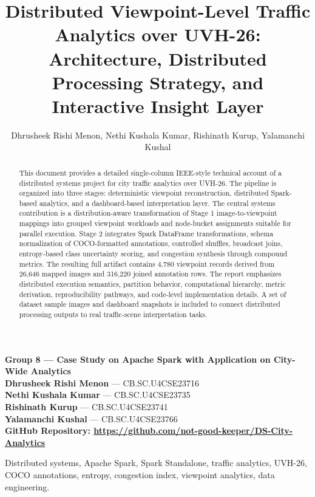 \documentclass[journal,onecolumn]{IEEEtran}
\title{Distributed Viewpoint-Level Traffic Analytics over UVH-26: \\
Architecture, Distributed Processing Strategy, and Interactive Insight Layer}
\author{Dhrusheek Rishi Menon, Nethi Kushala Kumar, Rishinath Kurup, Yalamanchi Kushal}
\begin{document}
\maketitle

\begin{center}
\textbf{Group 8 --- Case Study on Apache Spark with Application on City-Wide Analytics}\\[4pt]
\textbf{Dhrusheek Rishi Menon} --- CB.SC.U4CSE23716\\[2pt]
\textbf{Nethi Kushala Kumar} --- CB.SC.U4CSE23735\\[2pt]
\textbf{Rishinath Kurup} --- CB.SC.U4CSE23741\\[2pt]
\textbf{Yalamanchi Kushal} --- CB.SC.U4CSE23766\\[6pt]
\textbf{GitHub Repository: \url{https://github.com/not-good-keeper/DS-City-Analytics}}
\end{center}

\begin{abstract}
This document provides a detailed single-column IEEE-style technical account of a distributed systems project for city traffic analytics over UVH-26. The pipeline is organized into three stages: deterministic viewpoint reconstruction, distributed Spark-based analytics, and a dashboard-based interpretation layer. The central systems contribution is a distribution-aware transformation of Stage 1 image-to-viewpoint mappings into grouped viewpoint workloads and node-bucket assignments suitable for parallel execution. Stage 2 integrates Spark DataFrame transformations, schema normalization of COCO-formatted annotations, controlled shuffles, broadcast joins, entropy-based class uncertainty scoring, and congestion synthesis through compound metrics. The resulting full artifact contains 4,780 viewpoint records derived from 26,646 mapped images and 316,220 joined annotation rows. The report emphasizes distributed execution semantics, partition behavior, computational hierarchy, metric derivation, reproducibility pathways, and code-level implementation details. A set of dataset sample images and dashboard snapshots is included to connect distributed processing outputs to real traffic-scene interpretation tasks.
\end{abstract}

\begin{IEEEkeywords}
Distributed systems, Apache Spark, Spark Standalone, traffic analytics, UVH-26, COCO annotations, entropy, congestion index, viewpoint analytics, data engineering.
\end{IEEEkeywords}
\end{document}
